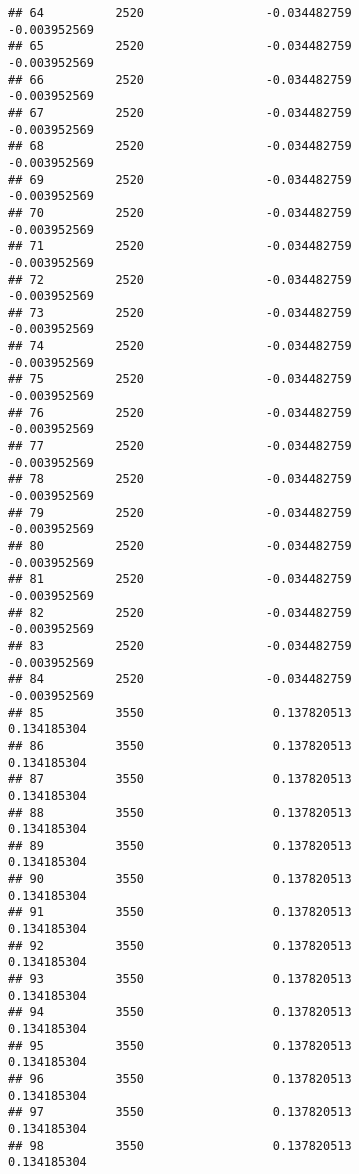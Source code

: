 \documentclass[]{article}
\begin{document}
\begin{verbatim}
## 64          2520                 -0.034482759               -0.003952569
## 65          2520                 -0.034482759               -0.003952569
## 66          2520                 -0.034482759               -0.003952569
## 67          2520                 -0.034482759               -0.003952569
## 68          2520                 -0.034482759               -0.003952569
## 69          2520                 -0.034482759               -0.003952569
## 70          2520                 -0.034482759               -0.003952569
## 71          2520                 -0.034482759               -0.003952569
## 72          2520                 -0.034482759               -0.003952569
## 73          2520                 -0.034482759               -0.003952569
## 74          2520                 -0.034482759               -0.003952569
## 75          2520                 -0.034482759               -0.003952569
## 76          2520                 -0.034482759               -0.003952569
## 77          2520                 -0.034482759               -0.003952569
## 78          2520                 -0.034482759               -0.003952569
## 79          2520                 -0.034482759               -0.003952569
## 80          2520                 -0.034482759               -0.003952569
## 81          2520                 -0.034482759               -0.003952569
## 82          2520                 -0.034482759               -0.003952569
## 83          2520                 -0.034482759               -0.003952569
## 84          2520                 -0.034482759               -0.003952569
## 85          3550                  0.137820513                0.134185304
## 86          3550                  0.137820513                0.134185304
## 87          3550                  0.137820513                0.134185304
## 88          3550                  0.137820513                0.134185304
## 89          3550                  0.137820513                0.134185304
## 90          3550                  0.137820513                0.134185304
## 91          3550                  0.137820513                0.134185304
## 92          3550                  0.137820513                0.134185304
## 93          3550                  0.137820513                0.134185304
## 94          3550                  0.137820513                0.134185304
## 95          3550                  0.137820513                0.134185304
## 96          3550                  0.137820513                0.134185304
## 97          3550                  0.137820513                0.134185304
## 98          3550                  0.137820513                0.134185304

\end{verbatim}
\end{document}

